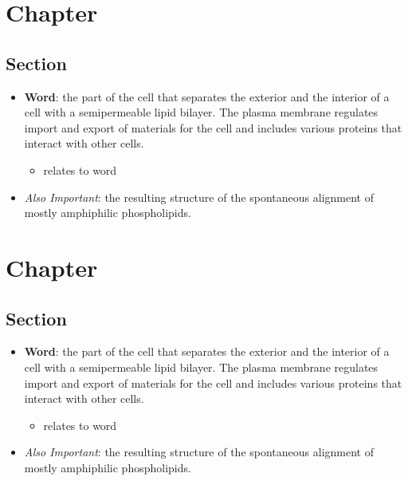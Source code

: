 \documentclass[12pt,a4paper]{article}
\begin{document}
\tableofcontents
\cleardoublepage
\fancyhead{}

\clearpage
\section{Chapter}
\subsection{Section}
\begin{itemize}
    \item \textbf{Word}: the part of the cell that separates the exterior and the interior of a cell with a semipermeable lipid bilayer. The plasma membrane regulates import and export of materials for the cell and includes various proteins that interact with other cells. 
    \begin{itemize}
        \item relates to word
    \end{itemize}
    \item \textit{Also Important}: the resulting structure of the spontaneous alignment of mostly amphiphilic phospholipids. 
\end{itemize}

\clearpage
\section{Chapter}
\subsection{Section}
\begin{itemize}
    \item \textbf{Word}: the part of the cell that separates the exterior and the interior of a cell with a semipermeable lipid bilayer. The plasma membrane regulates import and export of materials for the cell and includes various proteins that interact with other cells. 
    \begin{itemize}
        \item relates to word
    \end{itemize}
    \item \textit{Also Important}: the resulting structure of the spontaneous alignment of mostly amphiphilic phospholipids. 
\end{itemize}
\end{document}
